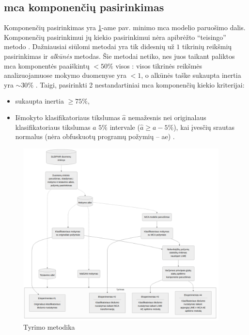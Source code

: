 \subsection{\gls{mca} komponenčių pasirinkimas}\label{sec:method:mca_comp_selection}
Komponenčių pasirinkimas yra \ref{fig:methodology}-ame pav. minimo \gls{mca} modelio paruošimo dalis. Komponenčių pasirinkimui \ty jų kiekio pasirinkimui nėra apibrėžto \enquote{teisingo} metodo \cite{abdiPrincipalComponentAnalysis2010}. Dažniausiai siūlomi metodai yra tik didesnių už $1$ tikrinių reikšmių pasirinkimas ir \textit{alkūnės}  metodas. Šie metodai netiko, nes juos taikant paliktos \gls{mca} komponentės paaiškintų $<50\%$ visos : visos tikrinės reikšmės analizuojamuose mokymo duomenyse yra $<1$, o alkūnės taške sukaupta \gls{inertia} yra $\sim 30\%$ . Taigi, pasirinkti 2 nestandartiniai \gls{mca} komponenčių kiekio kriterijai: 
\begin{itemize}
    \item sukaupta \gls{inertia} $\ge 75\%$,
    \item Išmokyto klasifikatoriaus tikslumas $\hat{a}$ nemažesnis nei originalaus klasifikatoriaus tikslumas $a$ $5\%$ intervale ($\hat{a} \ge a - 5\%$), kai įvesčių srautas normalus (nėra obfuskuotų programų požymių -- \gls{ae}) \TODO.
\end{itemize}

\begin{figure}[h]
    \centering
    \includegraphics[width=0.95\textwidth]{images/methodology.png}
    \caption{Tyrimo metodika}
    \label{fig:methodology}
\end{figure}

